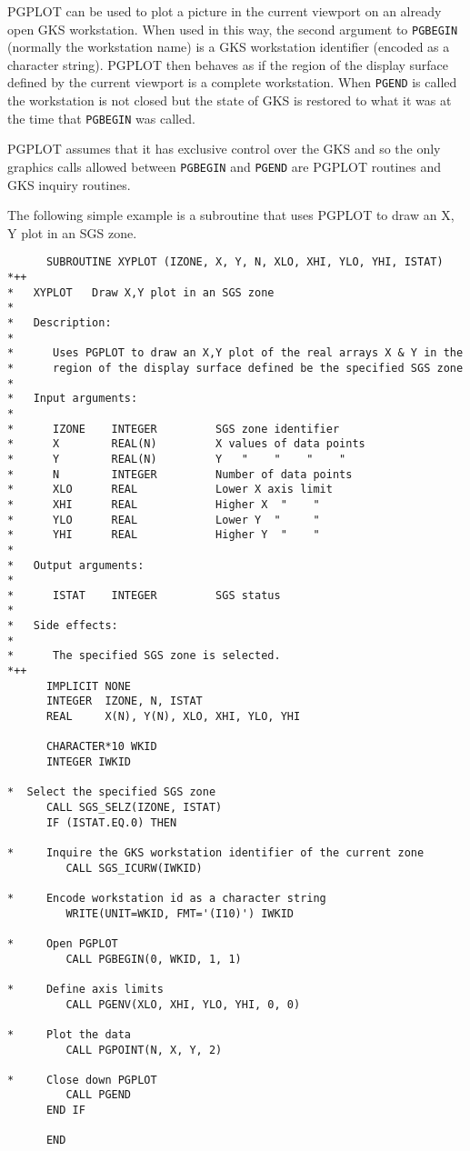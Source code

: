 PGPLOT can be used to plot a picture in the current viewport on an already open
GKS workstation. When used in this way, the second argument to {\tt PGBEGIN}
(normally the workstation name) is a GKS workstation identifier (encoded as a
character string). PGPLOT then behaves as if the region of the display surface
defined by the current viewport is a complete workstation. When {\tt PGEND} is
called the workstation is not closed but the state of GKS is restored to what
it was at the time that {\tt PGBEGIN} was called. 

PGPLOT assumes that it has exclusive control over the GKS and so the only
graphics calls allowed between {\tt PGBEGIN} and {\tt PGEND} are PGPLOT
routines and GKS inquiry routines. 

The following simple example is a subroutine that uses PGPLOT to draw an X, Y
plot in an SGS zone.

\begin{verbatim}
      SUBROUTINE XYPLOT (IZONE, X, Y, N, XLO, XHI, YLO, YHI, ISTAT)
*++
*   XYPLOT   Draw X,Y plot in an SGS zone
*
*   Description:
*   
*      Uses PGPLOT to draw an X,Y plot of the real arrays X & Y in the
*      region of the display surface defined be the specified SGS zone
*
*   Input arguments:
*   
*      IZONE    INTEGER         SGS zone identifier
*      X        REAL(N)         X values of data points
*      Y        REAL(N)         Y   "    "    "    "
*      N        INTEGER         Number of data points
*      XLO      REAL            Lower X axis limit
*      XHI      REAL            Higher X  "    "
*      YLO      REAL            Lower Y  "     "
*      YHI      REAL            Higher Y  "    "
*                                 
*   Output arguments:
*   
*      ISTAT    INTEGER         SGS status
*
*   Side effects:
*   
*      The specified SGS zone is selected.
*++
      IMPLICIT NONE
      INTEGER  IZONE, N, ISTAT
      REAL     X(N), Y(N), XLO, XHI, YLO, YHI

      CHARACTER*10 WKID
      INTEGER IWKID

*  Select the specified SGS zone
      CALL SGS_SELZ(IZONE, ISTAT)
      IF (ISTAT.EQ.0) THEN

*     Inquire the GKS workstation identifier of the current zone
         CALL SGS_ICURW(IWKID)

*     Encode workstation id as a character string
         WRITE(UNIT=WKID, FMT='(I10)') IWKID
      
*     Open PGPLOT
         CALL PGBEGIN(0, WKID, 1, 1)

*     Define axis limits
         CALL PGENV(XLO, XHI, YLO, YHI, 0, 0)

*     Plot the data
         CALL PGPOINT(N, X, Y, 2)
      
*     Close down PGPLOT
         CALL PGEND
      END IF
      
      END
\end{verbatim} 

